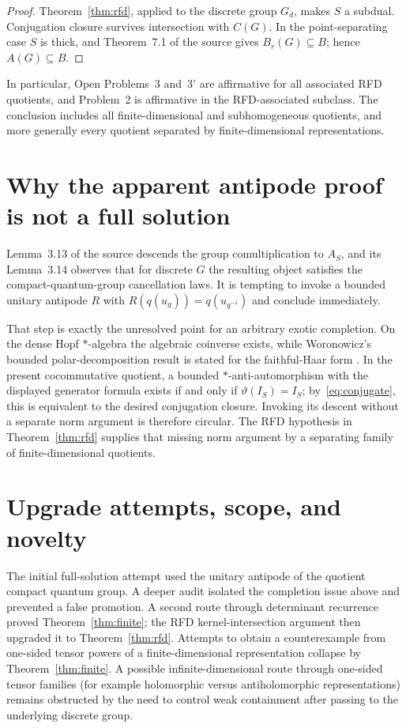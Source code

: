 \documentclass[11pt,a4paper]{article}
\begin{document}
\begin{proof}
Theorem~\ref{thm:rfd}, applied to the discrete group $G_d$, makes $S$ a
subdual.  Conjugation closure survives intersection with $C(G)$.  In the
point-separating case $S$ is thick, and Theorem~7.1 of the source gives
$B_r(G)\subseteq B$; hence $A(G)\subseteq B$.
\end{proof}

In particular, Open Problems~3 and~3' are affirmative for all associated
RFD quotients, and Problem~2 is affirmative in the RFD-associated subclass.
The conclusion includes all finite-dimensional and subhomogeneous quotients,
and more generally every quotient separated by finite-dimensional
representations.

\section{Why the apparent antipode proof is not a full solution}

Lemma~3.13 of the source descends the group comultiplication to $A_S$, and its
Lemma~3.14 observes that for discrete $G$ the resulting object satisfies the
compact-quantum-group cancellation laws.  It is tempting to invoke a bounded
unitary antipode $R$ with $R(q(u_g))=q(u_{g^{-1}})$ and conclude immediately.

That step is exactly the unresolved point for an arbitrary exotic completion.
On the dense Hopf $*$-algebra the algebraic coinverse exists, while Woronowicz's
bounded polar-decomposition result is stated for the faithful-Haar form
\cite[Theorem 1.6]{Woronowicz}.  In the present cocommutative quotient, a bounded
$*$-anti-automorphism with the displayed generator formula exists if and only if
$\vartheta(I_S)=I_S$; by~\eqref{eq:conjugate}, this is equivalent to the desired
conjugation closure.  Invoking its descent without a separate norm argument is
therefore circular.  The RFD hypothesis in Theorem~\ref{thm:rfd} supplies that
missing norm argument by a separating family of finite-dimensional quotients.

\section{Upgrade attempts, scope, and novelty}

The initial full-solution attempt used the unitary antipode of the quotient
compact quantum group.  A deeper audit isolated the completion issue above and
prevented a false promotion.  A second route through determinant recurrence
proved Theorem~\ref{thm:finite}; the RFD kernel-intersection argument then
upgraded it to Theorem~\ref{thm:rfd}.  Attempts to obtain a counterexample from
one-sided tensor powers of a finite-dimensional representation collapse by
Theorem~\ref{thm:finite}.  A possible infinite-dimensional route through
one-sided tensor families (for example holomorphic versus antiholomorphic
representations) remains obstructed by the need to control weak containment
after passing to the underlying discrete group.
\end{document}

